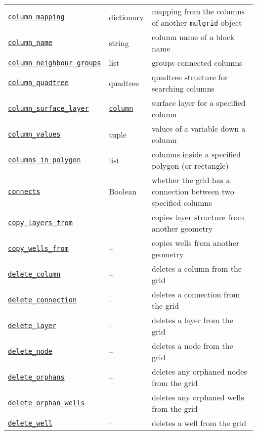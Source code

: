 \begin{center}
\begin{longtable}{|l|l|p{70mm}|}
  \hyperref[sec:mulgrid:column_mapping]{\texttt{column\_mapping}} & dictionary & mapping from the columns of another \texttt{mulgrid} object\\
  \hyperref[sec:mulgrid:column_name]{\texttt{column\_name}} & string & column name of a block name\\ 
  \hyperref[sec:mulgrid:column_neighbour_groups]{\texttt{column\_neighbour\_groups}} & list & groups connected columns\\ 
  \hyperref[sec:mulgrid:column_quadtree]{\texttt{column\_quadtree}} & quadtree & quadtree structure for searching columns\\ 
  \hyperref[sec:mulgrid:column_surface_layer]{\texttt{column\_surface\_layer}} & \hyperref[columnobjects]{\texttt{column}} & surface layer for a specified column\\
  \hyperref[sec:mulgrid:column_values]{\texttt{column\_values}} & tuple & values of a variable down a column\\
  \hyperref[sec:mulgrid:columns_in_polygon]{\texttt{columns\_in\_polygon}} & list & columns inside a specified polygon (or rectangle)\\ 
  \hyperref[sec:mulgrid:connects]{\texttt{connects}} & Boolean & whether the grid has a connection between two specified columns\\ 
  \hyperref[sec:mulgrid:copy_layers_from]{\texttt{copy\_layers\_from}} & -- & copies layer structure from another geometry\\ 
  \hyperref[sec:mulgrid:copy_wells_from]{\texttt{copy\_wells\_from}} & -- & copies wells from another geometry\\ 
  \hyperref[sec:mulgrid:delete_column]{\texttt{delete\_column}} & -- & deletes a column from the grid\\ 
  \hyperref[sec:mulgrid:delete_connection]{\texttt{delete\_connection}} & -- & deletes a connection from the grid\\ 
  \hyperref[sec:mulgrid:delete_layer]{\texttt{delete\_layer}} & -- & deletes a layer from the grid\\ 
  \hyperref[sec:mulgrid:delete_node]{\texttt{delete\_node}} & -- & deletes a node from the grid\\ 
  \hyperref[sec:mulgrid:delete_orphans]{\texttt{delete\_orphans}} & -- & deletes any orphaned nodes from the grid\\ 
  \hyperref[sec:mulgrid:delete_orphan_wells]{\texttt{delete\_orphan\_wells}} & -- & deletes any orphaned wells from the grid\\ 
  \hyperref[sec:mulgrid:delete_well]{\texttt{delete\_well}} & -- & deletes a well from the grid\\ 

\end{longtable}
\end{center}
